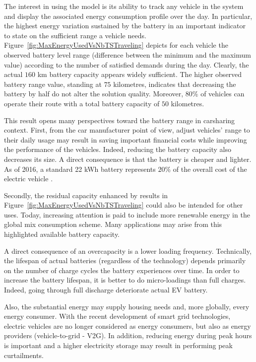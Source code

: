 \bigskip
The interest in using the {\ENERGY} model is its ability to track any vehicle in the system and display the associated energy consumption profile over the day.
In particular, the highest energy variation sustained by the battery in an important indicator to state on the sufficient range a vehicle needs.
Figure~\ref{fig:MaxEnergyUsedVsNbTSTraveling} depicts for each vehicle the observed battery level range (difference between the minimum and the maximum value) according to the number of satisfied demands during the day.
Clearly, the actual $160$ km battery capacity appears widely sufficient.
The higher observed battery range value, standing at $75$ kilometres, indicates that decreasing the battery by half do not alter the solution quality.
Moreover, $80$\% of vehicles can operate their route with a total battery capacity of $50$ kilometres.

\medskip
This result opens many perspectives toward the battery range in carsharing context.
First, from the car manufacturer point of view, adjust vehicles' range to their daily usage may result in saving important financial costs while improving the performance of the vehicles.
Indeed, reducing the battery capacity also decreases its size.
A direct consequence is that the battery is cheaper and lighter.
As of 2016, a standard 22 kWh battery represents $20$\% of the overall cost of the electric vehicle \cite{avem_prixEVs}.

Secondly, the residual capacity enhanced by results in Figure~\ref{fig:MaxEnergyUsedVsNbTSTraveling} could also be intended for other uses.
Today, increasing attention is paid to include more renewable energy in the global mix consumption  scheme.
Many applications may arise from this highlighted available battery capacity.

A direct consequence of an overcapacity is a lower loading frequency.
Technically, the lifespan of actual batteries (regardless of the technology) depends primarily on the number of charge cycles the battery experiences over time.
In order to increase the battery lifespan, it is better to do micro-loadings than full charges.
Indeed, going through full discharge deteriorate actual EV battery.

Also, the substantial energy may supply housing needs and, more globally, every energy consumer.
With the recent development of smart grid technologies, electric vehicles are no longer considered as energy consumers, but also as energy providers (\see vehicle-to-grid - V2G).
In addition, reducing energy during peak hours is important and a higher electricity storage may result in performing peak curtailments.

